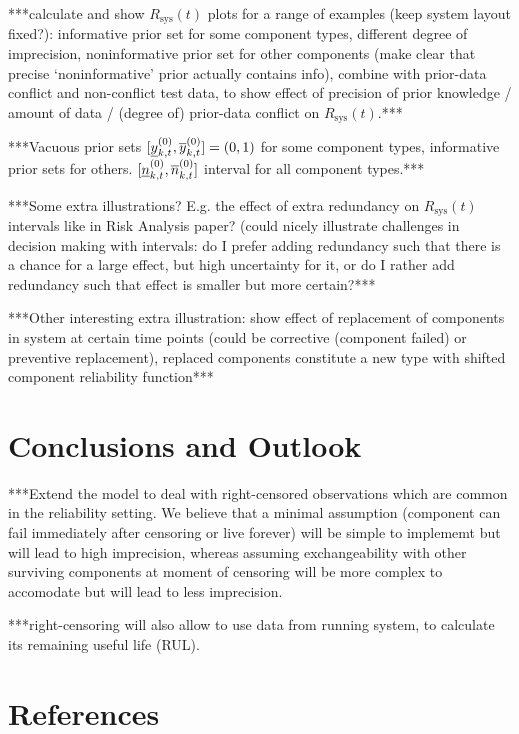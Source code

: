 \documentclass[authoryear, 12pt, a4paper]{elsarticle}
\newcommand{\Rsys}{R_\text{sys}}
\begin{document}
***calculate and show $\Rsys(t)$ plots for a range of examples (keep system layout fixed?):
informative prior set for some component types, different degree of imprecision,
noninformative prior set for other components (make clear that precise `noninformative' prior actually contains info), 
combine with prior-data conflict and non-conflict test data,
to show effect of precision of prior knowledge / amount of data / (degree of) prior-data conflict on $\Rsys(t)$.***

***Vacuous prior sets $[\underline{y}^{(0)}_{k,t}, \overline{y}^{(0)}_{k,t}] = (0,1)$ for some component types,
informative prior sets for others. $[\underline{n}^{(0)}_{k,t}, \overline{n}^{(0)}_{k,t}]$ interval for all component types.***

***Some extra illustrations? E.g. the effect of extra redundancy on $\Rsys(t)$ intervals like in Risk Analysis paper?
(could nicely illustrate challenges in decision making with intervals:
do I prefer adding redundancy such that there is a chance for a large effect, but high uncertainty for it,
or do I rather add redundancy such that effect is smaller but more certain?***

***Other interesting extra illustration:
show effect of replacement of components in system at certain time points
(could be corrective (component failed) or preventive replacement),
replaced components constitute a new type with shifted component reliability function***


\section{Conclusions and Outlook}

***Extend the model to deal with right-censored observations which are common in the reliability setting.
We believe that a minimal assumption (component can fail immediately after censoring or live forever)
will be simple to implememt but will lead to high imprecision,
whereas assuming exchangeability with other surviving components at moment of censoring
will be more complex to accomodate but will lead to less imprecision.

***right-censoring will also allow to use data from running system,
to calculate its remaining useful life (RUL).




\section*{References}



\end{document}
